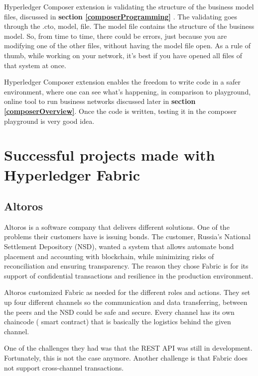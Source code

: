 \documentclass[a4paper,11pt]{report}
\begin{document}
Hyperledger Composer extension is validating the structure of the business model files, discussed in \textbf{section \ref{composerProgramming}} . The validating goes through the .cto, model, file. The model file contains the structure of the business model. So, from time to time, there could be errors, just because you are modifying one of the other files, without having the model file open. As a rule of thumb, while working on your network, it’s best if you have opened all files of that system at once.
  
Hyperledger Composer extension  enables the freedom to write code in a safer environment, where one can see what's happening, in comparison to playground, online tool to run business networks discussed later in \textbf{section \ref{composerOverview}}. Once the code is written, testing it in the composer playground is very good idea. 


\section{Successful projects made with Hyperledger Fabric}
\label{successfulFabric}

\subsection{Altoros}
\label{altoros}
Altoros is a software company that delivers different solutions. One of the problems their customers have is issuing bonds. The customer, Russia's National Settlement Depository (NSD), wanted a system that allows automate bond placement and accounting with blockchain, while minimizing risks of reconciliation and ensuring transparency. The reason they chose Fabric is for its support of confidential transactions and resilience in the production environment. \cite{altoros}

	Altoros customized Fabric as needed for the different roles and actions. They set up four different channels so the communication and data transferring, between the peers and the NSD could be safe and secure. Every channel has its own chaincode ( smart contract) that is basically the logistics behind the given channel.
	
	One of the challenges they had was that the REST API was still in development. Fortunately, this is not the case anymore. Another challenge is that Fabric does not support cross-channel transactions. \cite{altorosDemo}
	
\end{document}
